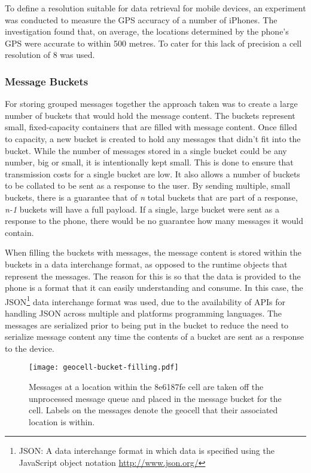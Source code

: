 \documentclass{article}
\begin{document}
To define a resolution suitable for data retrieval for mobile devices, an experiment was conducted to measure the GPS accuracy of a number of iPhones. The investigation found that, on average, the locations determined by the phone's GPS were accurate to within 500 metres. To cater for this lack of precision a cell resolution of 8 was used.

\subsubsection{Message Buckets} %

For storing grouped messages together the approach taken was to create a large number of buckets that would hold the message content. The buckets represent small, fixed-capacity containers that are filled with message content. Once filled to capacity, a new bucket is created to hold any messages that didn't fit into the bucket. While the number of messages stored in a single bucket could be any number, big or small, it is intentionally kept small. This is done to ensure that transmission costs for a single bucket are low. It also allows a number of buckets to be collated to be sent as a response to the user. By sending multiple, small buckets, there is a guarantee that of \emph{n} total buckets that are part of a response, \emph{n-1} buckets will have a full payload. If a single, large bucket were sent as a response to the phone, there would be no guarantee how many messages it would contain. 

When filling the buckets with messages, the message content is stored within the buckets in a data interchange format, as opposed to the runtime objects that represent the messages. The reason for this is so that the data is provided to the phone is a format that it can easily understanding and consume. In this case, the JSON\footnote{JSON: A data interchange format in which data is specified using the JavaScript object notation \url{http://www.json.org/}} data interchange format was used, due to the availability of APIs for handling JSON across multiple and platforms programming languages. The messages are serialized prior to being put in the bucket to reduce the need to serialize message content any time the contents of a bucket are sent as a response to the device.

\begin{figure}
\begin{center}
\texttt{[image: geocell-bucket-filling.pdf]}
\caption{Messages at a location within the 8e6187fe cell are taken off the unprocessed message queue and placed in the message bucket for the cell. Labels on the messages denote the geocell that their associated location is within.}
\label{fig:geocell_bucket_filling}
\end{center}
\end{figure}
\end{document}
